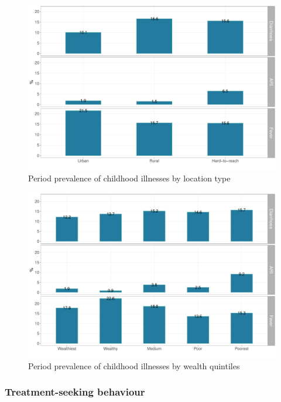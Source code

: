 \documentclass[12pt,a4paper]{article}
\begin{document}
\begin{figure}[H]

{\centering \includegraphics{kayahReport_files/figure-latex/ill1plot-1} 

}

\caption{Period prevalence of childhood illnesses by location type}\label{fig:ill1plot}
\end{figure}

\begin{figure}[H]

{\centering \includegraphics{kayahReport_files/figure-latex/ill2plot-1} 

}

\caption{Period prevalence of childhood illnesses by wealth quintiles}\label{fig:ill2plot}
\end{figure}

\hypertarget{ctreatment}{%
\subsubsection{Treatment-seeking behaviour}\label{ctreatment}}
\end{document}
